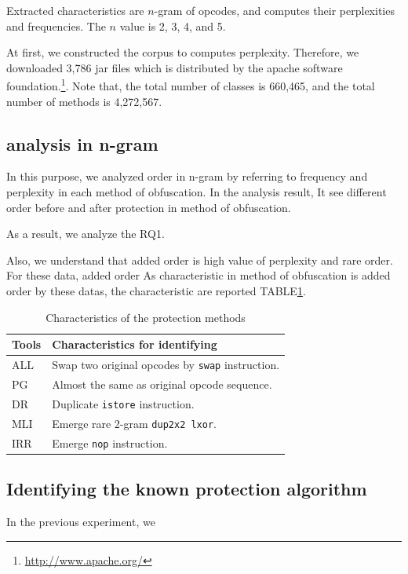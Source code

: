 \documentclass[conference]{IEEEtran}
\begin{document}
Extracted characteristics are $n$-gram of opcodes, and computes their
perplexities and frequencies.  The $n$ value is 2, 3, 4, and 5.

At first, we constructed the corpus to computes perplexity.
Therefore, we downloaded 3,786 jar files which is distributed by the
apache software foundation.\footnote{\url{http://www.apache.org/}}.
Note that, the total number of classes is 660,465, and the total
number of methods is 4,272,567.


\subsection{analysis in n-gram}

In this purpose, we analyzed order in n-gram by referring to frequency
and perplexity in each method of obfuscation.  In the analysis result,
It see different order before and after protection in method of
obfuscation.

As a result, we analyze the RQ1.

Also, we understand that added order is high value of perplexity and
rare order.  For these data, added order As characteristic in method
of obfuscation is added order by these datas, the characteristic are
reported TABLE\ref{table:features}.

\begin{table}[t]
  \centering
  \footnotesize{
    \caption{Characteristics of the protection methods}\label{table:features}
  \begin{tabular}{l|p{6.5cm}}
    {\bf Tools} & {\bf Characteristics for identifying} \\ \hline
    ALL  & Swap two original opcodes by \texttt{swap} instruction. \\
    PG   & Almost the same as original opcode sequence. \\
    DR   & Duplicate \texttt{istore} instruction. \\
    MLI  & Emerge rare 2-gram \texttt{dup2x2 lxor}. \\
    IRR  & Emerge \texttt{nop} instruction. \\
  \end{tabular}}
\end{table}


\subsection{Identifying the known protection algorithm}

In the previous experiment, we 
\end{document}
